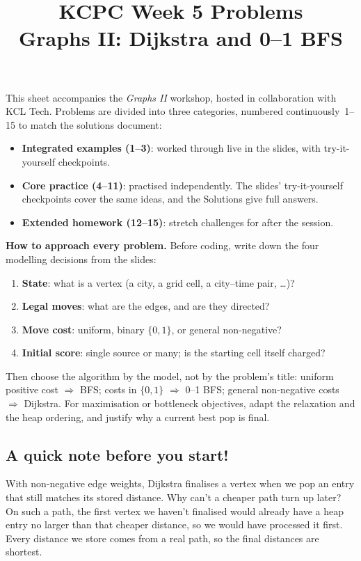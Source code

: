 \documentclass[12pt]{article}
\title{KCPC Week 5 Problems\\Graphs II: Dijkstra and 0--1 BFS}
\author{}\date{}
\begin{document}
\maketitle\thispagestyle{fancy}

This sheet accompanies the \emph{Graphs II} workshop, hosted in collaboration with KCL Tech. Problems are divided into three categories, numbered continuously~1--15 to match the solutions document:
\begin{itemize}
  \item \textbf{Integrated examples (1--3)}: worked through live in the slides, with try-it-yourself checkpoints.
  \item \textbf{Core practice (4--11)}: practised independently. The slides' try-it-yourself checkpoints cover the same ideas, and the Solutions give full answers.
  \item \textbf{Extended homework (12--15)}: stretch challenges for after the session.
\end{itemize}

\textbf{How to approach every problem.} Before coding, write down the four modelling decisions from the slides:
\begin{enumerate}
  \item \textbf{State}: what is a vertex (a city, a grid cell, a city--time pair, \ldots)?
  \item \textbf{Legal moves}: what are the edges, and are they directed?
  \item \textbf{Move cost}: uniform, binary $\{0,1\}$, or general non-negative?
  \item \textbf{Initial score}: single source or many; is the starting cell itself charged?
\end{enumerate}
Then choose the algorithm by the model, not by the problem's title: uniform positive cost $\Rightarrow$ BFS; costs in $\{0,1\}$ $\Rightarrow$ 0--1 BFS; general non-negative costs $\Rightarrow$ Dijkstra. For maximisation or bottleneck objectives, adapt the relaxation and the heap ordering, and justify why a current best pop is final.

\subsection*{A quick note before you start!}

With non-negative edge weights, Dijkstra finalises a vertex when we pop an entry that still matches its stored distance. Why can't a cheaper path turn up later? On such a path, the first vertex we haven't finalised would already have a heap entry no larger than that cheaper distance, so we would have processed it first. Every distance we store comes from a real path, so the final distances are shortest.
\end{document}

